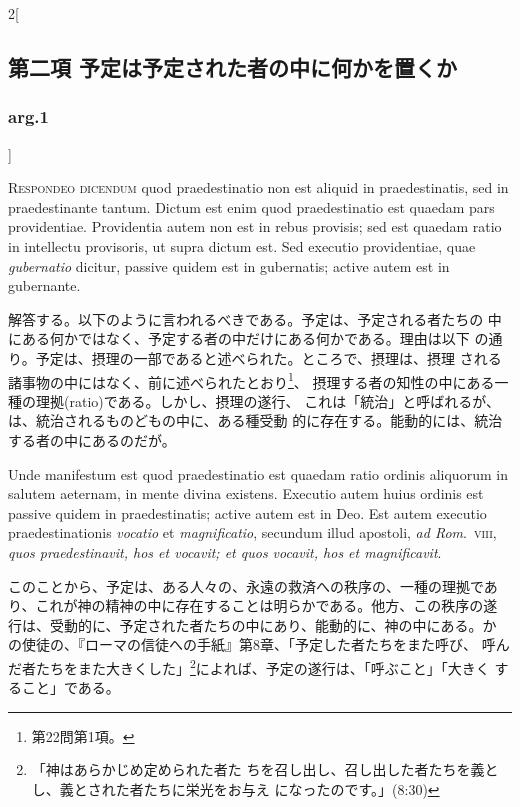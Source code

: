 \documentclass[paper=a4paper,fontsize=10pt,jafontsize=9pt,titlepage]{jlreq}
\begin{document}
\begin{paracol}{2}[\subsection{第二項 予定は予定された者の中に何かを置くか}\subsubsection{arg.1}]


{\scshape Respondeo dicendum} quod praedestinatio non est
aliquid in praedestinatis, sed in praedestinante tantum. Dictum est enim
quod praedestinatio est quaedam pars providentiae. Providentia autem non
est in rebus provisis; sed est quaedam ratio in intellectu provisoris,
ut supra dictum est. Sed executio providentiae, quae {\itshape gubernatio} dicitur,
 passive quidem est in gubernatis; active autem est in gubernante.


\switchcolumn


解答する。以下のように言われるべきである。予定は、予定される者たちの
 中にある何かではなく、予定する者の中だけにある何かである。理由は以下
 の通り。予定は、摂理の一部であると述べられた。ところで、摂理は、摂理
 される諸事物の中にはなく、前に述べられたとおり\footnote{第22問第1項。}、
 摂理する者の知性の中にある一種の理拠(ratio)である。しかし、摂理の遂行、
 これは「統治」と呼ばれるが、は、統治されるものどもの中に、ある種受動
 的に存在する。能動的には、統治する者の中にあるのだが。


\switchcolumn*


Unde
manifestum est quod praedestinatio est quaedam ratio ordinis aliquorum
in salutem aeternam, in mente divina existens. Executio autem huius
ordinis est passive quidem in praedestinatis; active autem est in
Deo. Est autem executio praedestinationis {\itshape vocatio} et {\itshape magnificatio},
secundum illud apostoli, {\itshape ad Rom}.~{\scshape viii}, {\itshape quos praedestinavit, hos et
vocavit; et quos vocavit, hos et magnificavit}.


\switchcolumn


このことから、予定は、ある人々の、永遠の救済への秩序の、一種の理拠であ
り、これが神の精神の中に存在することは明らかである。他方、この秩序の遂
行は、受動的に、予定された者たちの中にあり、能動的に、神の中にある。か
の使徒の、『ローマの信徒への手紙』第8章、「予定した者たちをまた呼び、
呼んだ者たちをまた大きくした」\footnote{「神はあらかじめ定められた者た
ちを召し出し、召し出した者たちを義とし、義とされた者たちに栄光をお与え
になったのです。」(8:30)}によれば、予定の遂行は、「呼ぶこと」「大きく
すること」である。


\switchcolumn*[\subsubsection{ad.1}]



\end{paracol}
\end{document}
